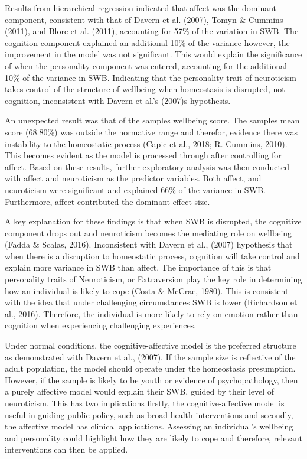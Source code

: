 \documentclass[man,floatsintext]{apa6}
\theoremstyle{definition}
\theoremstyle{definition}
\theoremstyle{definition}
\theoremstyle{remark}
\begin{document}
Results from hierarchical regression indicated that affect was the
dominant component, consistent with that of Davern et al. (2007), Tomyn
\& Cummins (2011), and Blore et al. (2011), accounting for 57\% of the
variation in SWB. The cognition component explained an additional 10\%
of the variance however, the improvement in the model was not
significant. This would explain the significance of when the personality
component was entered, accounting for the additional 10\% of the
variance in SWB. Indicating that the personality trait of neuroticism
takes control of the structure of wellbeing when homeostasis is
disrupted, not cognition, inconsistent with Davern et al.'s (2007)s
hypothesis.

An unexpected result was that of the samples wellbeing score. The
samples mean score (68.80\%) was outside the normative range and
therefor, evidence there was instability to the homeostatic process
(Capic et al., 2018; R. Cummins, 2010). This becomes evident as the
model is processed through after controlling for affect. Based on these
results, further exploratory analysis was then conducted with affect and
neuroticism as the predictor variables. Both affect, and neuroticism
were significant and explained 66\% of the variance in SWB. Furthermore,
affect contributed the dominant effect size.

A key explanation for these findings is that when SWB is disrupted, the
cognitive component drops out and neuroticism becomes the mediating role
on wellbeing (Fadda \& Scalas, 2016). Inconsistent with Davern et al.,
(2007) hypothesis that when there is a disruption to homeostatic
process, cognition will take control and explain more variance in SWB
than affect. The importance of this is that personality traits of
Neuroticism, or Extraversion play the key role in determining how an
individual is likely to cope (Costa \& McCrae, 1980). This is consistent
with the idea that under challenging circumstances SWB is lower
(Richardson et al., 2016). Therefore, the individual is more likely to
rely on emotion rather than cognition when experiencing challenging
experiences.

Under normal conditions, the cognitive-affective model is the preferred
structure as demonstrated with Davern et al., (2007). If the sample size
is reflective of the adult population, the model should operate under
the homeostasis presumption. However, if the sample is likely to be
youth or evidence of psychopathology, then a purely affective model
would explain their SWB, guided by their level of neuroticism. This has
two implications firstly, the cognitive-affective model is useful in
guiding public policy, such as broad health interventions and secondly,
the affective model has clinical applications. Assessing an individual's
wellbeing and personality could highlight how they are likely to cope
and therefore, relevant interventions can then be applied.
\end{document}
